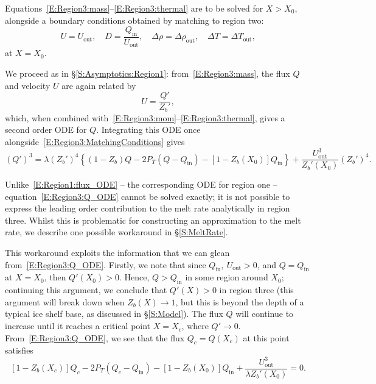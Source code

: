 \documentclass{jfm}
\newcommand{\Pt}{\textit{P}_T}
\renewcommand{\in}{\text{in}} %
\newcommand{\out}{\text{out}}
\begin{document}
Equations~\eqref{E:Region3:mass}--\eqref{E:Region3:thermal} are to be solved for $X > X_0$, alongside a boundary conditions obtained by matching to region two:
\begin{equation}\label{E:Region3:MatchingConditions}
U = U_\out, \quad D = \frac{Q_\in}{U_\out}, \quad \Delta \rho = \Delta \rho_\out, \quad \Delta T = \Delta T_\out,
\end{equation}
at $X = X_0$. 

We proceed as in \S\ref{S:Asymptotics:Region1}: from~\eqref{E:Region3:mass}, the flux $Q$ and velocity $U$ are again related by
\begin{equation}\label{E:Region3:U_Q_relation}
U = \frac{Q'}{Z_b'},
\end{equation}
which, when combined with~\eqref{E:Region3:mom}--\eqref{E:Region3:thermal}, gives a second order ODE for $Q$. Integrating this ODE once alongside~\eqref{E:Region3:MatchingConditions} gives
\begin{equation}\label{E:Region3:Q_ODE}
\left(Q'\right)^3 =\lambda \left(Z_b'\right)^4 \left\{\left(1 - Z_b\right)Q - 2\Pt\left(Q - Q_\in\right) -\left[1 - Z_b(X_0)\right]Q_\in\right\} + \frac{U_\out^3}{Z_b'(X_0)}\left(Z_b'\right)^4.
\end{equation}

Unlike~\eqref{E:Region1:flux_ODE} -- the corresponding ODE for region one -- equation~\eqref{E:Region3:Q_ODE} cannot be solved exactly; it is not possible to express the leading order contribution to the melt rate analytically in region three. Whilst this is problematic for constructing an approximation to the melt rate, we describe one possible workaround in \S\ref{S:MeltRate}. 

This workaround exploits the information that we can glean from~\eqref{E:Region3:Q_ODE}. Firstly, we note that since $Q_\in, ~U_\out >0$, and $Q = Q_\in$ at $X = X_0$, then $Q'(X_0) > 0$. Hence, $Q > Q_\in$ in some region around $X_0$; continuing this argument, we conclude that  $Q'(X)> 0$ in region three (this argument will break down when $Z_b(X) \to 1$, but this is beyond the depth of a typical ice shelf base, as discussed in \S\ref{S:Model}). The flux $Q$ will continue to increase until it reaches a critical point $X = X_c$, where $Q' \to 0$. From~\eqref{E:Region3:Q_ODE}, we see that the flux $ Q_c =Q(X_c)$ at this point satisfies 
\begin{equation}
\left[1 - Z_b(X_c)\right]Q_c - 2\Pt\left(Q_c - Q_\in\right) -\left[1 - Z_b(X_0)\right]Q_\in +  \frac{U_\out^3}{\lambda Z_b'(X_0)} = 0.
\end{equation}
\end{document}

